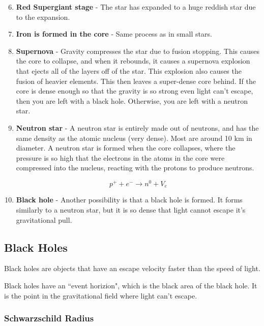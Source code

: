 \documentclass[a4paper, 12pt]{article}
\begin{document}
\begin{enumerate}
	\setcounter{enumi}{5}

	\item \textbf{Red Supergiant stage} - The star has expanded to a huge reddish star due to the expansion.

	\item \textbf{Iron is formed in the core} - Same process as in small stars.

	\item \textbf{Supernova} - Gravity compresses the star due to fusion stopping. This causes the core to collapse, and when it rebounds, it causes a supernova explosion that ejects all of the layers off of the star. This explosion also causes the fusion of heavier elements. This then leaves a super-dense core behind. If the core is dense enough so that the gravity is so strong even light can't escape, then you are left with a black hole. Otherwise, you are left with a neutron star.

	\item {\textbf{Neutron star} - A neutron star is entirely made out of neutrons, and has the same density as the atomic nucleus (very dense). Most are around 10 km in diameter. A neutron star is formed when the core collapses, where the pressure is so high that the electrons in the atoms in the core were compressed into the nucleus, reacting with the protons to produce neutrons.
	
	$$
	p^+ + e^- \rightarrow n^0 + V_e
	$$}

	\item \textbf{Black hole} - Another possibility is that a black hole is formed. It forms similarly to a neutron star, but it is so dense that light cannot escape it's gravitational pull.

\end{enumerate}

\subsection{Black Holes}

Black holes are objects that have an escape velocity faster than the speed of light.

Black holes have an ``event horizion", which is the black area of the black hole. It is the point in the gravitational field where light can't escape.

\subsubsection{Schwarzschild Radius}
\end{document}
